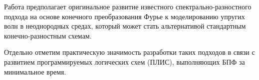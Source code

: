Работа предполагает оригинальное развитие известного спектрально-разностного подхода
на основе конечного преобразования Фурье к моделированию упругих волн в
неоднородных средах, который может стать альтернативой стандартным конечно-разностным схемам.

Отдельно отметим практическую значимость разработки таких подходов в связи с развитием
программируемых логических схем (ПЛИС), выполняющих БПФ за минимальное время.

\clearpage
